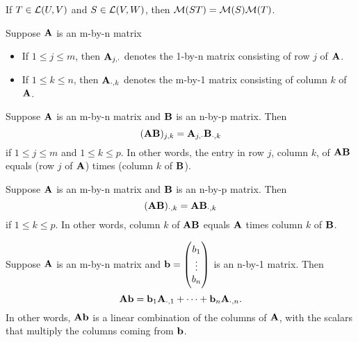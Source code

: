 \documentclass{extarticle}
\begin{document}
\begin{thm}
    If \(T \in \mathcal{L}(U, V)\) and \(S \in \mathcal{L}(V, W)\), then \(\mathcal{M}(ST) = \mathcal{M}(S)\mathcal{M}(T)\).
\end{thm}


\begin{definition}
    Suppose \(\mathbf{A}\) is an m-by-n matrix 
    \begin{itemize}
        \item If \(1 \leq j \leq m\), then \(\mathbf{A}_{j, \cdot}\) denotes the 1-by-n matrix 
        consisting of row \(j\) of \(\mathbf{A}\). 
        \item If \(1 \leq k \leq n\), then \(\mathbf{A}_{\cdot, k}\) denotes the m-by-1 matrix consisting 
        of column \(k\) of \(\mathbf{A}\). 
    \end{itemize}
\end{definition}

\begin{corollary}
    Suppose \(\mathbf{A}\) is an m-by-n matrix and \(\mathbf{B}\) is an n-by-p matrix. Then 
    \[(\mathbf{A} \mathbf{B})_{j, k} = \mathbf{A}_{j, \cdot} \mathbf{B}_{\cdot, k}\]
    if \(1 \leq j \leq m\) and \(1 \leq k \leq p\). In other words, the entry in row \(j\), 
    column \(k\), of \(\mathbf{A} \mathbf{B}\) equals (row \(j\) of \(\mathbf{A}\)) times (column \(k\) of \(\mathbf{B}\)). 
\end{corollary}

\begin{corollary}
Suppose \(\mathbf{A}\) is an m-by-n matrix and \(\mathbf{B}\) is an n-by-p matrix. Then 
\[(\mathbf{A} \mathbf{B})_{\cdot, k} = \mathbf{A} \mathbf{B}_{\cdot, k}\]
if \(1 \leq k \leq p\). In other words, column \(k\) of \(\mathbf{A} \mathbf{B}\) equals \(\mathbf{A}\) times 
column \(k\) of \(\mathbf{B}\). 
\end{corollary}

\begin{corollary}
    Suppose \(\mathbf{A}\) is an m-by-n matrix and \(\mathbf{b} = \begin{pmatrix}
        b_1 \\ 
        \vdots \\ 
        b_n
    \end{pmatrix}\) is an n-by-1 matrix. Then 
    \[\mathbf{A} \mathbf{b} = \mathbf{b}_1 \mathbf{A}_{\cdot, 1} + \cdots + \mathbf{b}_n \mathbf{A}_{\cdot, n}.\]
    In other words, \(\mathbf{A} \mathbf{b}\) is a linear combination of the columns of \(\mathbf{A}\), with the scalars 
    that multiply the columns coming from \(\mathbf{b}\). 
\end{corollary}
\end{document}

